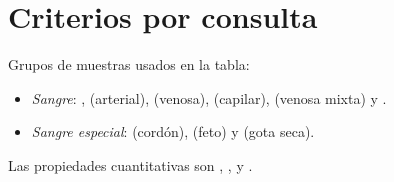 \documentclass[11pt,a4paper]{article}
\begin{document}
\section{Criterios por consulta}

Grupos de muestras usados en la tabla:
\begin{itemize}
\item \emph{Sangre}: ,  (arterial),  (venosa),  (capilar),  (venosa mixta) y .
\item \emph{Sangre especial}:  (cordón),  (feto) y  (gota seca).
\end{itemize}
Las propiedades cuantitativas son , ,  y .
\end{document}
